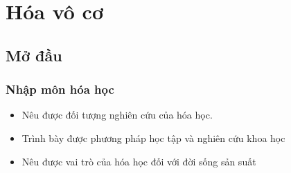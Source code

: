 \documentclass[Main.tex]{subfiles}
\begin{document}
\titlespacing*{\subsubsection}{0cm}{0pt}{0pt}
\part{Hóa vô cơ}
\chapter{Mở đầu}
\section{Nhập môn hóa học}
\begin{MuctieuH}
	\begin{itemize}
		\item Nêu được đối tượng nghiên cứu của hóa học.
		\item Trình bày được phương pháp học tập và nghiên cứu khoa học
		\item Nêu được vai trò của hóa học đối với đời sống sản suất
	\end{itemize}
\end{MuctieuH}
\end{document}
